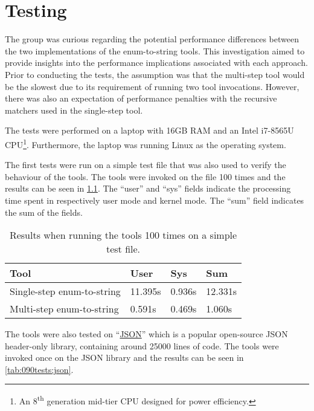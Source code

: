 \chapter{Testing}
The group was curious regarding the potential performance differences between the two implementations of the enum-to-string tools.
This investigation aimed to provide insights into the performance implications associated with each approach.
Prior to conducting the tests, the assumption was that the multi-step tool would be the slowest due to its requirement of running two tool invocations.
However, there was also an expectation of performance penalties with the recursive matchers used in the single-step tool.

The tests were performed on a laptop with 16GB RAM and an Intel i7-8565U CPU\footnote{
    An 8\textsuperscript{th} generation mid-tier CPU designed for power efficiency.
}. Furthermore, the laptop was running Linux as the operating system.

The first tests were run on a simple test file that was also used to verify the behaviour of the tools. The tools were invoked on the file 100 times and the results can be seen in \cref{tab:090tests:simple}. The ``user'' and ``sys'' fields indicate the processing time spent in respectively user mode and kernel mode. The ``sum'' field indicates the sum of the fields.

\begin{table}[H]
    \centering
    \begin{tabular}{|p{}|p{}|p{}|p{}|}
    \hline
    \rowcolor{gray!30}
    \textbf{Tool} & \textbf{User} & \textbf{Sys} & \textbf{Sum} \\ \hline
    Single-step enum-to-string & 11.395s & 0.936s & 12.331s \\ \hline
    Multi-step enum-to-string & 0.591s & 0.469s & 1.060s \\ \hline
    \end{tabular}
    \caption{Results when running the tools 100 times on a simple test file.}
    \label{tab:090tests:simple}
\end{table}
\vspace*{-1em}

The tools were also tested on ``\href{https://github.com/nlohmann/json}{JSON}'' which is a popular open-source JSON header-only library, containing around 25000 lines of code.
The tools were invoked once on the JSON library and the results can be seen in \cref{tab:090tests:json}.

